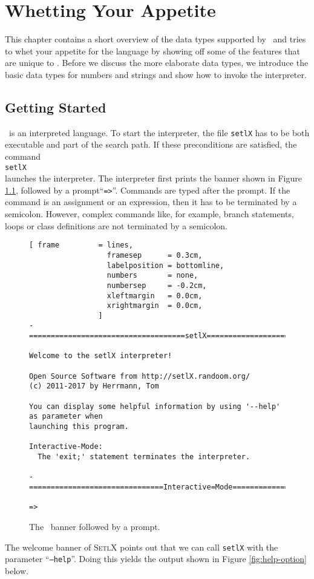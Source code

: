 \chapter{Whetting Your Appetite}
This chapter contains a short overview of the data types supported by
\setlx\ and tries to whet your appetite for the language by showing off some of
the features that are unique to \setlx.  Before we discuss the more elaborate data types,
we introduce the basic data types for numbers and strings and show how to invoke the interpreter.


\section{Getting Started}
\setlx\ is an interpreted language.  To start the interpreter,  the file
\texttt{setlX} has to be both executable and part of the search path.   If these
preconditions are satisfied, the command
\\[0.2cm]
\hspace*{1.3cm}
\texttt{setlX}
\\[0.2cm]
 launches the interpreter.  The interpreter first prints the banner shown in Figure
\ref{fig:banner}, followed by a prompt``\texttt{=>}''.  Commands are typed after the prompt.    
If the command is an assignment or an expression, then it has to be terminated by a semicolon.
However, complex commands like, for example, branch statements, loops or class definitions are not
terminated by a semicolon. 

\begin{figure}[!ht]
\centering
\begin{Verbatim}[ frame         = lines, 
                  framesep      = 0.3cm, 
                  labelposition = bottomline,
                  numbers       = none,
                  numbersep     = -0.2cm,
                  xleftmargin   = 0.0cm,
                  xrightmargin  = 0.0cm,
                ]
-====================================setlX=============================v2.6.2=-

Welcome to the setlX interpreter!

Open Source Software from http://setlX.randoom.org/
(c) 2011-2017 by Herrmann, Tom

You can display some helpful information by using '--help' as parameter when
launching this program.

Interactive-Mode:
  The 'exit;' statement terminates the interpreter.

-===============================Interactive=Mode==============================-

=>
\end{Verbatim}
\vspace*{-0.3cm}
\caption{The \setlx\ banner followed by a prompt.}
\label{fig:banner}
\end{figure}
\noindent
The welcome banner of \textsc{SetlX} points out that we can call \texttt{setlX} with the parameter 
``\texttt{--help}''.   Doing this yields the output shown in Figure \ref{fig:help-option} below. 


